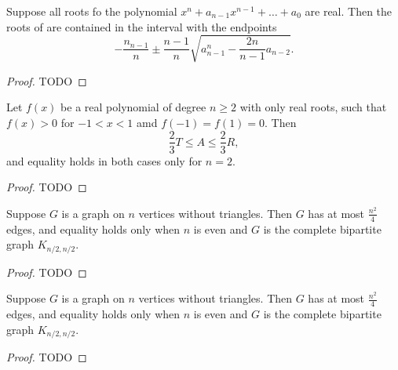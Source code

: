 \begin{theorem}
  \label{ch20theorem1}
  Suppose all roots fo the polynomial
  $x^n + a_{n - 1}x^{n - 1} + \dots +a_0$ are real.
  Then the roots of are contained in the interval with the endpoints
  \[
  -\frac{n_{n-1}}{n}\pm\frac{n - 1}{n}\sqrt{a^n_{n - 1} - \frac{2n}{n - 1}a_{n - 2}}.
  \]
\end{theorem}
\begin{proof}
  TODO
\end{proof}



\begin{theorem}
  \label{ch20theorem2} Let $f(x)$ be a real polynomial of degree $n \ge 2$ with only real
  roots, such that $f(x)> 0$ for $ -1 < x < 1$ amd $f(-1) = f(1) = 0$. Then
  \[
  \frac{2}{3}T \le A \le \frac{2}{3}R,
  \]
  and equality holds in both cases only for $n=2$.
\end{theorem}
\begin{proof}
  TODO
\end{proof}

\begin{theorem}
  \label{ch20theorem3proof1}
  Suppose $G$ is a graph on $n$ vertices without triangles. Then $G$
  has at most $\frac{n^2}{4}$ edges, and equality holds only when $n$ is even and $G$ is the
  complete bipartite graph $K_{n/2, n/2}$.
\end{theorem}
\begin{proof}
  TODO
\end{proof}

\begin{theorem}
  \label{ch20theorem3proof2}
  Suppose $G$ is a graph on $n$ vertices without triangles. Then $G$
  has at most $\frac{n^2}{4}$ edges, and equality holds only when $n$ is even and $G$ is the
  complete bipartite graph $K_{n/2, n/2}$.
\end{theorem}
\begin{proof}
  TODO
\end{proof}
